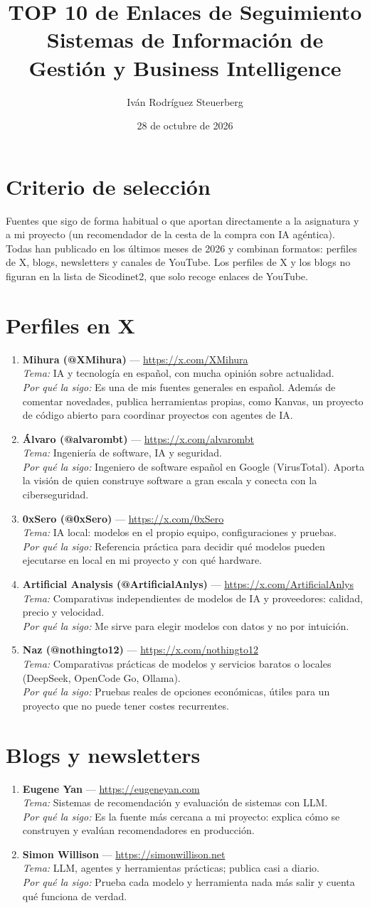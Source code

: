 \documentclass[11pt,a4paper]{article}
\title{TOP 10 de Enlaces de Seguimiento \\ \large Sistemas de Información de Gestión y Business Intelligence}
\author{Iván Rodríguez Steuerberg}
\date{28 de octubre de 2026}
\newcommand{\fuente}[4]{\item \textbf{#1} --- \url{#2} \\ \textit{Tema:} #3 \\ \textit{Por qué la sigo:} #4}
\begin{document}
	\maketitle

	\section*{Criterio de selección}
	Fuentes que sigo de forma habitual o que aportan directamente a la asignatura y a mi proyecto (un recomendador de la cesta de la compra con IA agéntica). Todas han publicado en los últimos meses de 2026 y combinan formatos: perfiles de X, blogs, newsletters y canales de YouTube. Los perfiles de X y los blogs no figuran en la lista de Sicodinet2, que solo recoge enlaces de YouTube.

	\section{Perfiles en X}
	\begin{enumerate}[itemsep=8pt]
		\fuente{Mihura (@XMihura)}{https://x.com/XMihura}{IA y tecnología en español, con mucha opinión sobre actualidad.}{Es una de mis fuentes generales en español. Además de comentar novedades, publica herramientas propias, como Kanvas, un proyecto de código abierto para coordinar proyectos con agentes de IA.}
		\fuente{Álvaro (@alvarombt)}{https://x.com/alvarombt}{Ingeniería de software, IA y seguridad.}{Ingeniero de software español en Google (VirusTotal). Aporta la visión de quien construye software a gran escala y conecta con la ciberseguridad.}
		\fuente{0xSero (@0xSero)}{https://x.com/0xSero}{IA local: modelos en el propio equipo, configuraciones y pruebas.}{Referencia práctica para decidir qué modelos pueden ejecutarse en local en mi proyecto y con qué hardware.}
		\fuente{Artificial Analysis (@ArtificialAnlys)}{https://x.com/ArtificialAnlys}{Comparativas independientes de modelos de IA y proveedores: calidad, precio y velocidad.}{Me sirve para elegir modelos con datos y no por intuición.}
		\fuente{Naz (@nothingto12)}{https://x.com/nothingto12}{Comparativas prácticas de modelos y servicios baratos o locales (DeepSeek, OpenCode Go, Ollama).}{Pruebas reales de opciones económicas, útiles para un proyecto que no puede tener costes recurrentes.}

	\end{enumerate}

	\section{Blogs y newsletters}
	\begin{enumerate}[resume, itemsep=8pt]
		\fuente{Eugene Yan}{https://eugeneyan.com}{Sistemas de recomendación y evaluación de sistemas con LLM.}{Es la fuente más cercana a mi proyecto: explica cómo se construyen y evalúan recomendadores en producción.}
		\fuente{Simon Willison}{https://simonwillison.net}{LLM, agentes y herramientas prácticas; publica casi a diario.}{Prueba cada modelo y herramienta nada más salir y cuenta qué funciona de verdad.}
	\end{enumerate}
\end{document}
